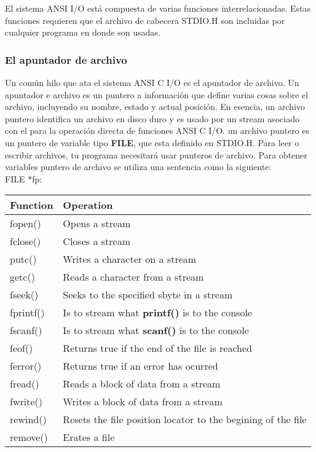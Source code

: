 \documentclass[]{article}
\begin{document}
	El sistema ANSI I/O está compuesta de varias funciones interrelacionadas. Estas funciones requieren que el archivo de cabecera STDIO.H son incluidas por cualquier programa en donde son usadas.
	
	\subsubsection{El apuntador de archivo}
	
	Un común hilo que ata el sistema ANSI C I/O es el apuntador de archivo. Un apuntador e archivo es un puntero a información que define varias cosas sobre el archivo, incluyendo su nombre, estado y actual posición. En esencia, un archivo puntero identifica un archivo en disco duro y es usado por un stream asociado con el para la operación directa de funciones ANSI C I/O. un archivo puntero es un puntero de variable tipo \textbf{FILE}, que esta definido en STDIO.H. Para leer o escribir archivos, tu programa necesitará usar punteros de archivo. Para obtener variables puntero de archivo se utiliza una sentencia como la siguiente:\\
	
	FILE *fp:\\
	
	\begin{tabular}{l|l}
		\textbf{Function} & \textbf{Operation}\\
		\hline
		fopen() & Opens a stream\\[.7ex]
		fclose() & Closes a stream\\[.7ex]
		putc() & Writes a character on a stream\\[.7ex]
		getc() & Reads a character from a stream\\[.7ex]
		fseek() & Seeks to the specified sbyte in a stream\\[.7ex]
		fprintf() & Is to stream what \textbf{printf()} is to the console\\[.7ex]
		fscanf() & Is to stream what \textbf{scanf()} is to the console\\[.7ex]
		feof() & Returns true if the end of the file is reached\\[.7ex]
		ferror() & Returns true if an error has ocurred\\[.7ex]
		fread() & Reads a block of data from a stream\\[.7ex]
		fwrite() & Writes a block of data from a stream\\[.7ex]
		rewind() & Resets the file position locator to the begining of the file\\[.7ex]
		remove() & Erates a file
	\end{tabular}
	
\end{document}

